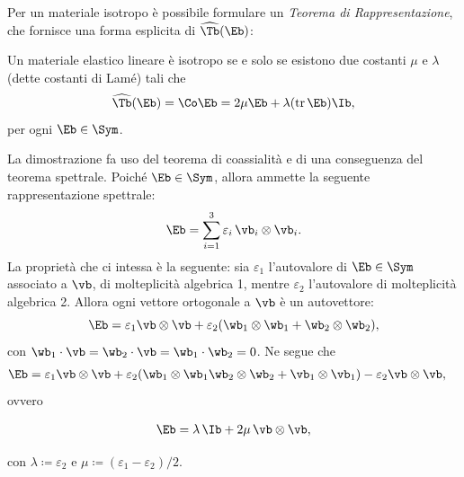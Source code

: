 Per un materiale isotropo è possibile formulare un \textit{Teorema di Rappresentazione}, che fornisce una forma esplicita di $\widehat{\Tb}(\Eb)$:
\begin{definition}
Un materiale elastico lineare è isotropo se e solo se esistono due costanti $\mu$ e $\lambda$ (dette costanti di Lamé) tali che
\begin{equation}
	\widehat{\Tb}(\Eb)=\Co \Eb =2 \mu \Eb +\lambda(\operatorname{tr} \Eb )\Ib,
\end{equation}
per ogni $\Eb\in\Sym$.
\end{definition}

La dimostrazione fa uso del teorema di coassialità e di una conseguenza del teorema spettrale. Poiché $\Eb\in \Sym$,  allora ammette la seguente rappresentazione spettrale:
\begin{equation}\label{espettr}
	\Eb=\sum_{i=1}^{3}\varepsilon_i\, \vb_i\otimes \vb_i.
\end{equation}
La proprietà che ci intessa è la seguente:  sia $\varepsilon_1$ l'autovalore di $\Eb\in \Sym$ associato a $\vb$, di molteplicità algebrica 1, mentre $\varepsilon_2$ l'autovalore di molteplicità algebrica 2. Allora ogni vettore ortogonale a $\vb$ è un autovettore:
\begin{equation}
\Eb=\varepsilon_1 \vb \otimes \vb + \varepsilon_2 (\wb_1\otimes\wb_1+\wb_2\otimes\wb_2),
\end{equation} 
con $\wb_1\cdot\vb = \wb_2\cdot \vb=\wb_1\cdot\wb_2=0$.
Ne segue che
\begin{equation}
\begin{aligned}
\Eb &=\varepsilon_1 \vb \otimes \vb+\varepsilon_2(\wb_1\otimes\wb_1\wb_2\otimes\wb_2+\vb_1\otimes\vb_1)-\varepsilon_2\vb \otimes \vb,
\end{aligned}
\end{equation}
ovvero 
\begin{definition}
\begin{equation}\label{Evv}
	\begin{aligned}
		\Eb  =\lambda\, \Ib +2\mu \,\vb \otimes \vb,
	\end{aligned}
\end{equation}
\end{definition}
con $\lambda\coloneqq \varepsilon_2$ e $\mu\coloneqq(\varepsilon_1-\varepsilon_2)/2$.


\vspace{.3cm}

